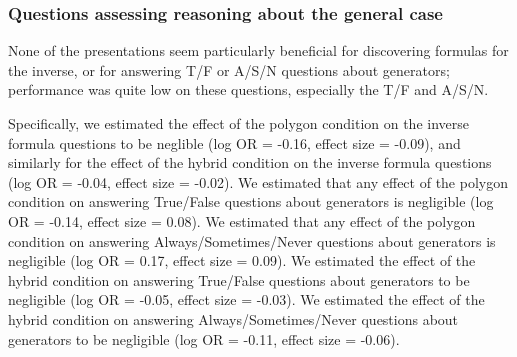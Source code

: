 \documentclass[man,10pt]{apa6}
\begin{document}
\subsubsection{Questions assessing reasoning about the general case}
None of the presentations seem particularly beneficial for discovering formulas for the inverse, or for answering T/F or A/S/N questions about generators; performance was quite low on these questions, especially the T/F and A/S/N. \par
Specifically, we estimated the effect of the polygon condition on the inverse formula questions to be neglible (log OR = -0.16, effect size = -0.09), and similarly for the effect of the hybrid condition on the inverse formula questions (log OR = -0.04, effect size = -0.02). We estimated that any effect of the polygon condition on answering True/False questions about generators is negligible (log OR = -0.14, effect size = 0.08). We estimated that any effect of the polygon condition on answering Always/Sometimes/Never questions about generators is negligible (log OR = 0.17, effect size = 0.09). We estimated the effect of the hybrid condition on answering True/False questions about generators to be negligible (log OR = -0.05, effect size = -0.03). We estimated the effect of the hybrid condition on answering Always/Sometimes/Never questions about generators to be negligible (log OR = -0.11, effect size = -0.06). \par
\end{document}

